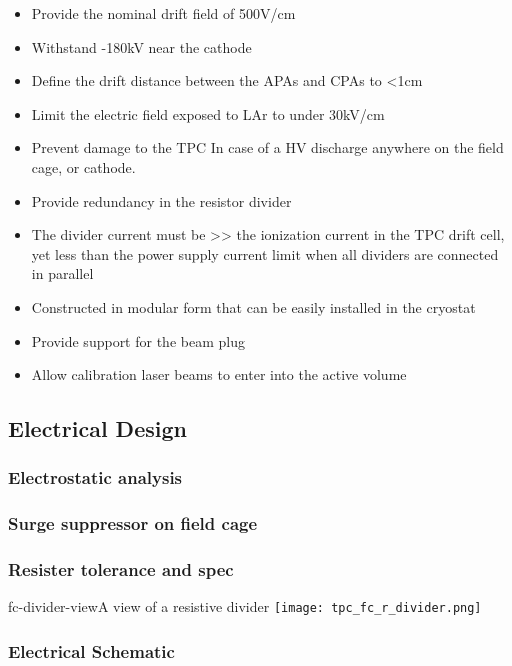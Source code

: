 \begin{itemize}
\item Provide the nominal drift field of 500V/cm 
\item Withstand -180kV near the cathode
\item Define the drift distance between the APAs and CPAs to <1cm
\item Limit the electric field exposed to LAr to under 30kV/cm
\item Prevent damage to the TPC In case of a HV discharge anywhere on the field cage, or cathode.
\item Provide redundancy in the resistor divider
\item The divider current must be >> the ionization current in the TPC drift cell, yet less than the power supply current limit when all dividers are connected in parallel
\item Constructed in modular form that can be easily installed in the cryostat
\item Provide support for the beam plug
\item Allow calibration laser beams to enter into the active volume 
\end{itemize}

\subsection{Electrical Design}

\subsubsection{Electrostatic analysis}

\subsubsection{Surge suppressor on field cage}

\subsubsection{Resister tolerance and spec}

\begin{cdrfigure}{fc-divider-view}{A view of a resistive divider}
\texttt{[image: tpc\_fc\_r\_divider.png]}
\end{cdrfigure}

\subsubsection{Electrical Schematic}
 

